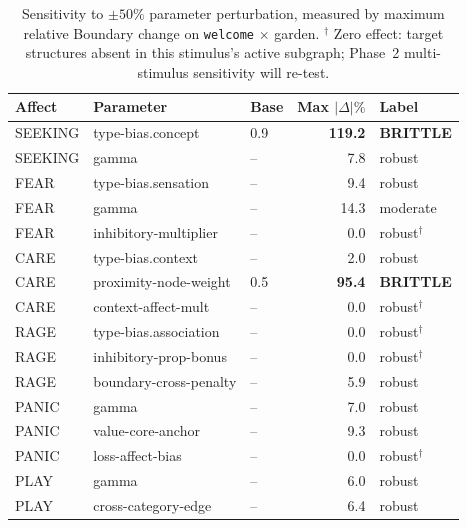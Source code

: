 \documentclass{article}
\begin{document}
\begin{table}[h]
\centering
\caption{Sensitivity to $\pm 50\%$ parameter perturbation, measured by
maximum relative Boundary change on \texttt{welcome} $\times$ garden.
$^\dagger$ Zero effect: target structures absent in this stimulus's active
subgraph; Phase~2 multi-stimulus sensitivity will re-test.}
\label{tab:sensitivity}
\begin{tabular}{lll r l}
\toprule
Affect & Parameter & Base & Max $|\Delta|\%$ & Label \\
\midrule
SEEKING & type-bias.concept       & 0.9 & \textbf{119.2} & \textbf{BRITTLE} \\
SEEKING & gamma                   & --  & 7.8           & robust \\
FEAR    & type-bias.sensation     & --  & 9.4           & robust \\
FEAR    & gamma                   & --  & 14.3          & moderate \\
FEAR    & inhibitory-multiplier   & --  & 0.0           & robust$^\dagger$ \\
CARE    & type-bias.context       & --  & 2.0           & robust \\
CARE    & proximity-node-weight   & 0.5 & \textbf{95.4} & \textbf{BRITTLE} \\
CARE    & context-affect-mult     & --  & 0.0           & robust$^\dagger$ \\
RAGE    & type-bias.association   & --  & 0.0           & robust$^\dagger$ \\
RAGE    & inhibitory-prop-bonus   & --  & 0.0           & robust$^\dagger$ \\
RAGE    & boundary-cross-penalty  & --  & 5.9           & robust \\
PANIC   & gamma                   & --  & 7.0           & robust \\
PANIC   & value-core-anchor       & --  & 9.3           & robust \\
PANIC   & loss-affect-bias        & --  & 0.0           & robust$^\dagger$ \\
PLAY    & gamma                   & --  & 6.0           & robust \\
PLAY    & cross-category-edge     & --  & 6.4           & robust \\
\bottomrule
\end{tabular}
\end{table}
\end{document}
